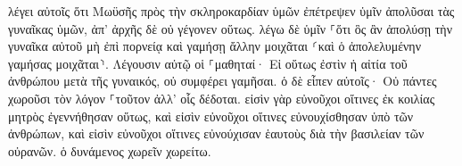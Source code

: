 \documentclass{openreader}
\begin{document}
λέγει αὐτοῖς ὅτι Μωϋσῆς πρὸς τὴν σκληροκαρδίαν ὑμῶν ἐπέτρεψεν ὑμῖν ἀπολῦσαι τὰς γυναῖκας ὑμῶν, ἀπ’ ἀρχῆς δὲ οὐ γέγονεν οὕτως. 
λέγω δὲ ὑμῖν ⸀ὅτι ὃς ἂν ἀπολύσῃ τὴν γυναῖκα αὐτοῦ μὴ ἐπὶ πορνείᾳ καὶ γαμήσῃ ἄλλην μοιχᾶται ⸂καὶ ὁ ἀπολελυμένην γαμήσας μοιχᾶται⸃. 
Λέγουσιν αὐτῷ οἱ ⸀μαθηταί· Εἰ οὕτως ἐστὶν ἡ αἰτία τοῦ ἀνθρώπου μετὰ τῆς γυναικός, οὐ συμφέρει γαμῆσαι. 
ὁ δὲ εἶπεν αὐτοῖς· Οὐ πάντες χωροῦσι τὸν λόγον ⸀τοῦτον ἀλλ’ οἷς δέδοται. 
εἰσὶν γὰρ εὐνοῦχοι οἵτινες ἐκ κοιλίας μητρὸς ἐγεννήθησαν οὕτως, καὶ εἰσὶν εὐνοῦχοι οἵτινες εὐνουχίσθησαν ὑπὸ τῶν ἀνθρώπων, καὶ εἰσὶν εὐνοῦχοι οἵτινες εὐνούχισαν ἑαυτοὺς διὰ τὴν βασιλείαν τῶν οὐρανῶν. ὁ δυνάμενος χωρεῖν χωρείτω. 
\end{document}
